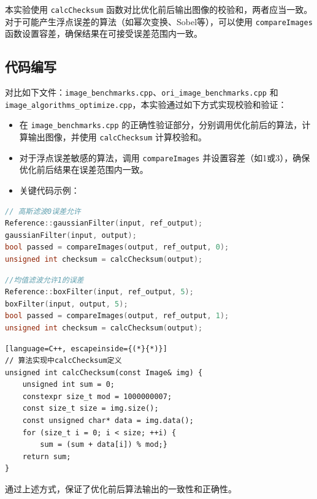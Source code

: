 \documentclass[a4paper]{article}
\begin{document}
本实验使用 \texttt{calcChecksum} 函数对比优化前后输出图像的校验和，两者应当一致。对于可能产生浮点误差的算法（如幂次变换、Sobel等），可以使用 \texttt{compareImages} 函数设置容差，确保结果在可接受误差范围内一致。

\subsection{代码编写}

\begin{raggedright}
对比如下文件：\texttt{image\_benchmarks.cpp}、\texttt{ori\_image\_benchmarks.cpp} 和 \texttt{image\_algorithms\_optimize.cpp}，本实验通过如下方式实现校验和验证：
\end{raggedright}

\begin{itemize}
    \item 在 \texttt{image\_benchmarks.cpp} 的正确性验证部分，分别调用优化前后的算法，计算输出图像，并使用 \texttt{calcChecksum} 计算校验和。
    \item 对于浮点误差敏感的算法，调用 \texttt{compareImages} 并设置容差（如1或3），确保优化前后结果在误差范围内一致。
    \item 关键代码示例：
\end{itemize}

\begin{lstlisting}[language=C++]
// 高斯滤波0误差允许
Reference::gaussianFilter(input, ref_output);
gaussianFilter(input, output);
bool passed = compareImages(output, ref_output, 0);
unsigned int checksum = calcChecksum(output);
\end{lstlisting}

\begin{lstlisting}[language=C++]
//均值滤波允许1的误差
Reference::boxFilter(input, ref_output, 5);
boxFilter(input, output, 5);
bool passed = compareImages(output, ref_output, 1);
unsigned int checksum = calcChecksum(output);
\end{lstlisting}

\begin{lstlisting}[language=C++, escapeinside={(*}{*)}]
// 算法实现中calcChecksum定义
unsigned int calcChecksum(const Image& img) {
    unsigned int sum = 0;
    constexpr size_t mod = 1000000007;
    const size_t size = img.size();
    const unsigned char* data = img.data();
    for (size_t i = 0; i < size; ++i) {
        sum = (sum + data[i]) % mod;}
    return sum;
}
\end{lstlisting}

通过上述方式，保证了优化前后算法输出的一致性和正确性。
\end{document}
